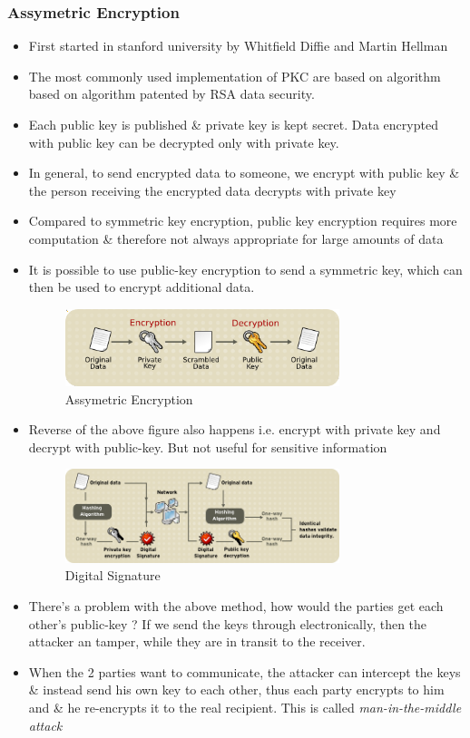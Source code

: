 \documentclass[12pt]{report}
\begin{document}
\subsubsection{Assymetric Encryption}
\begin{itemize}
    \item First started in stanford university by Whitfield Diffie and Martin Hellman
    \item The most commonly used implementation of PKC are based on algorithm based on algorithm patented by RSA data security.
    \item Each public key is published \& private key is kept secret. Data encrypted with public key can be decrypted only with private key.
    \item In general, to send encrypted data to someone, we encrypt with public key \& the person receiving the 
        encrypted data decrypts with private key
    \item Compared to symmetric key encryption, public key encryption requires more computation \& therefore not always appropriate for large amounts of data
    \item It is possible to use public-key encryption to send a symmetric key, which can then be used to encrypt additional data.
        \begin{figure}[h]
            \centering
            \includegraphics[width=80mm]{Images/assymetric.png}
            \caption{Assymetric Encryption}
        \end{figure}
    \item Reverse of the above figure also happens i.e. encrypt with private key and decrypt with public-key. But not useful for sensitive information
        \begin{figure}[h]
        \centering
        \includegraphics[width=80mm]{Images/digitalsignature.png}
        \caption{Digital Signature ~\cite{RedHat:CSoverview}} 
        \end{figure}
    \item There's a problem with the above method, how would the parties get each other's public-key ? 
        If we send the keys through electronically, then the attacker an tamper, while they are in transit to the receiver.
    \item When the 2 parties want to communicate, the attacker can intercept the keys \& instead send his own key to each other, 
        thus each party encrypts to him and \& he re-encrypts it to the real recipient. 
        This is called \textit{man-in-the-middle attack}
\end{itemize}
\end{document}
